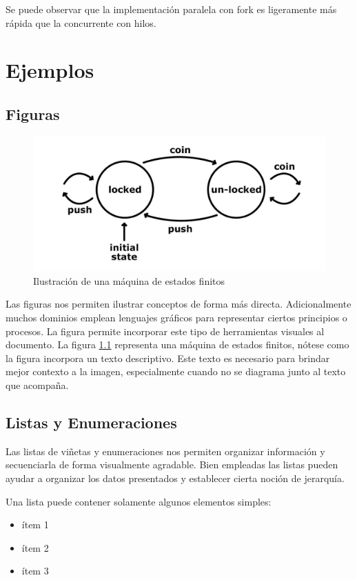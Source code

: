 \documentclass{report}
\begin{document}
Se puede observar que la implementación paralela con fork es ligeramente más rápida que la  concurrente con hilos.


\chapter{Ejemplos}\label{ejemplos}

\section{Figuras}\label{figuras}
\begin{figure}
    \centering
    \includegraphics[width=0.8\linewidth]{figuras/maquinaDeEstados.jpg}
    \caption{Ilustración de una máquina de estados finitos}
    \label{fig:msf}
\end{figure}

Las figuras nos permiten ilustrar conceptos de forma más directa. Adicionalmente muchos dominios emplean lenguajes gráficos para representar ciertos principios o procesos. La figura permite incorporar este tipo de herramientas visuales al documento. 
La figura \ref{fig:msf} representa una máquina de estados finitos, nótese como la figura incorpora un texto descriptivo. Este texto es necesario para brindar mejor contexto a la imagen, especialmente cuando no se diagrama junto al texto que acompaña.

\section{Listas y Enumeraciones}\label{listas}

Las listas de viñetas y enumeraciones nos permiten organizar información y secuenciarla de forma visualmente agradable. Bien empleadas las listas pueden ayudar a organizar los datos presentados y establecer cierta noción de jerarquía.

Una lista puede contener solamente algunos elementos simples:
\begin{itemize}
    \item ítem 1
    \item ítem 2
    \item ítem 3
\end{itemize}
\end{document}
